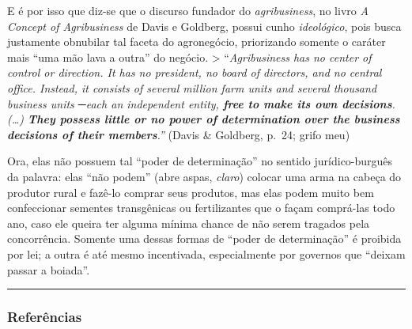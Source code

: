 \documentclass[12pt]{article}
\numberwithin{equation}{section}
\theoremstyle{plain}
\theoremstyle{definition}
\theoremstyle{remark}
\begin{document}
E é por isso que diz-se que o discurso fundador do \textit{agribusiness}, no livro \textit{A Concept of Agribusiness} de Davis e Goldberg, possui cunho \textit{ideológico}, pois busca justamente obnubilar tal faceta do agronegócio, priorizando somente o caráter mais ``uma mão lava a outra'' do negócio. \textgreater{} ``\textit{Agribusiness has no center of control or direction. It has no president, no board of directors, and no central office. Instead, it consists of several million farm units and several thousand business units ─each an independent entity, \textbf{free to make its own decisions}. (\ldots) \textbf{They possess little or no power of determination over the business decisions of their members}.''} (Davis \& Goldberg, p.~24; grifo meu)

Ora, elas não possuem tal ``poder de determinação'' no sentido jurídico-burguês da palavra: elas ``não podem'' (abre aspas, \textit{claro}) colocar uma arma na cabeça do produtor rural e fazê-lo comprar seus produtos, mas elas podem muito bem confeccionar sementes transgênicas ou fertilizantes que o façam comprá-las todo ano, caso ele queira ter alguma mínima chance de não serem tragados pela concorrência. Somente uma dessas formas de ``poder de determinação'' é proibida por lei; a outra é até mesmo incentivada, especialmente por governos que ``deixam passar a boiada''.

\begin{center}\rule{0.5\linewidth}{0.5pt}\end{center}

\hypertarget{referuxeancias}{%
\subsubsection{Referências}\label{referuxeancias}}
\end{document}
